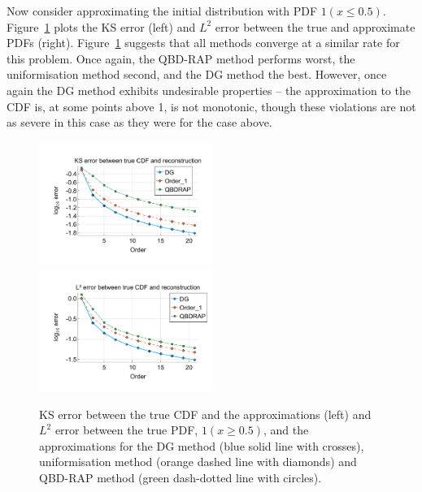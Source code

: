 \begin{example}Now consider approximating the initial distribution with PDF \(1(x\leq 0.5)\). Figure~\ref{fig: fun 2 comp} plots the KS error (left) and \(L^2\) error between the true and approximate PDFs (right). Figure~\ref{fig: fun 2 comp} suggests that all methods converge at a similar rate for this problem. Once again, the QBD-RAP method performs worst, the uniformisation method second, and the DG method the best. However, once again the DG method exhibits undesirable properties -- the approximation to the CDF is, at some points above 1, is not monotonic, though these violations are not as severe in this case as they were for the case above. 
\begin{figure}
	\centering
	\includegraphics[width=0.5\textwidth,trim={1.25cm 0.8cm 0.25cm 1.25cm},clip]{chapter6/figs/comp/fun2/meshs_ks_error_formatted.pdf}%
	\includegraphics[width=0.5\textwidth,trim={1.25cm 0.8cm 0.25cm 1.25cm},clip]{chapter6/figs/comp/fun2/meshs_l2_pdf_error_formatted.pdf}
	\caption{KS error between the true CDF and the approximations (left) and \(L^2\) error between the true PDF, \(1(x\geq 0.5)\), and the approximations for the DG method (blue solid line with crosses), uniformisation method (orange dashed line with diamonds) and QBD-RAP method (green dash-dotted line with circles).}
	\label{fig: fun 2 comp} 
\end{figure}
\end{example}

